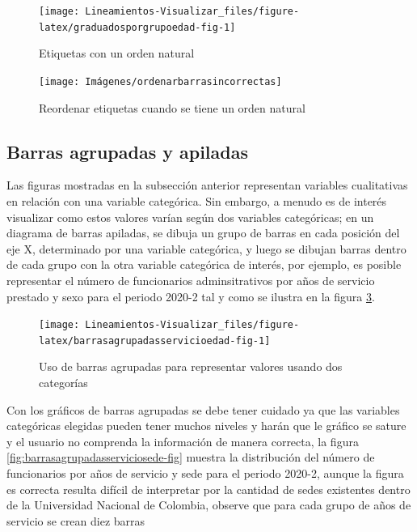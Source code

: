 \documentclass[
]{book}
\begin{document}
\begin{figure}

{\centering \texttt{[image: Lineamientos-Visualizar\_files/figure-latex/graduadosporgrupoedad-fig-1]} 

}

\caption{Etiquetas con un orden natural}\label{fig:graduadosporgrupoedad-fig}
\end{figure}

\begin{figure}

{\centering \texttt{[image: Imágenes/ordenarbarrasincorrectas]} 

}

\caption{Reordenar etiquetas cuando se tiene un orden natural}\label{fig:partesgrafico2-fig}
\end{figure}

\hypertarget{barras-agrupadas-y-apiladas}{%
\subsection{Barras agrupadas y apiladas}\label{barras-agrupadas-y-apiladas}}

Las figuras mostradas en la subsección anterior representan variables cualitativas en relación con una variable categórica. Sin embargo, a menudo es de interés visualizar como estos valores varían según dos variables categóricas; en un diagrama de barras apiladas, se dibuja un grupo de barras en cada posición del eje X, determinado por una variable categórica, y luego se dibujan barras dentro de cada grupo con la otra variable categórica de interés, por ejemplo, es posible representar el número de funcionarios adminsitrativos por años de servicio prestado y sexo para el periodo 2020-2 tal y como se ilustra en la figura \ref{fig:barrasagrupadasservicioedad-fig}.

\begin{figure}

{\centering \texttt{[image: Lineamientos-Visualizar\_files/figure-latex/barrasagrupadasservicioedad-fig-1]} 

}

\caption{Uso de barras agrupadas para representar valores usando dos categorías}\label{fig:barrasagrupadasservicioedad-fig}
\end{figure}

Con los gráficos de barras agrupadas se debe tener cuidado ya que las variables categóricas elegidas pueden tener muchos niveles y harán que le gráfico se sature y el usuario no comprenda la información de manera correcta, la figura \ref{fig:barrasagrupadasserviciosede-fig} muestra la distribución del número de funcionarios por años de servicio y sede para el periodo 2020-2, aunque la figura es correcta resulta difícil de interpretar por la cantidad de sedes existentes dentro de la Universidad Nacional de Colombia, observe que para cada grupo de años de servicio se crean diez barras
\end{document}
